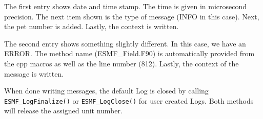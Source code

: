 The first entry shows date and time stamp.  The time is given in microsecond 
precision.  The next item shown is the type of message (INFO in this case).  
Next, the pet number is added.  Lastly, the context is written.

The second entry shows something slightly different.  In this case, we have
an ERROR.  The method name (ESMF\_Field.F90) is automatically provided from 
the cpp macros as well as the line number (812).  Lastly, the context of the 
message is written.
 
When done writing messages, the default Log is closed by calling 
{\tt ESMF\_LogFinalize()}  or {\tt ESMF\_LogClose()} for user created Logs.  
Both methods will release the assigned unit number.




